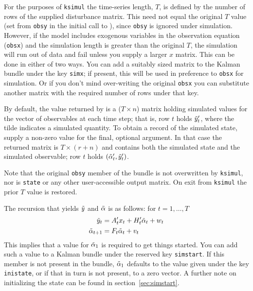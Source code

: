 \documentclass[a4paper]{article}
\begin{document}
For the purposes of \texttt{ksimul} the time-series length, $T$, is
defined by the number of rows of the supplied disturbance matrix. This
need not equal the original $T$ value (set from \texttt{obsy} in the
initial call to ), since \texttt{obsy} is ignored under
simulation. However, if the model includes exogenous variables in the
observation equation (\texttt{obsx}) and the simulation length is
greater than the original $T$, the simulation will run out of data and
fail unless you supply a larger $x$ matrix.  This can be done in
either of two ways. You can add a suitably sized matrix to the Kalman
bundle under the key \texttt{simx}; if present, this will be used in
preference to \texttt{obsx} for simulation. Or if you don't mind
over-writing the original \texttt{obsx} you can substitute another
matrix with the required number of rows under that key.

By default, the value returned by  is a ($T \times n$)
matrix holding simulated values for the vector of observables at each
time step; that is, row $t$ holds $\tilde{y}_t'$, where the tilde
indicates a simulated quantity.  To obtain a record of the simulated
state, supply a non-zero value for the final, optional argument. In
that case the returned matrix is $T \times (r+n)$ and contains both
the simulated state and the simulated observable; row $t$ holds
$(\tilde{\alpha}_t', \tilde{y}_t')$.

Note that the original \texttt{obsy} member of the bundle is not
overwritten by \texttt{ksimul}, nor is \texttt{state} or any other
user-accessible output matrix. On exit from \texttt{ksimul} the prior
$T$ value is restored.

The recursion that yields $\tilde{y}$ and $\tilde{\alpha}$
is as follows: for $t=1,\dots,T$
%
\begin{align*}
  \tilde{y}_t &= A_t'x_t + 
   H_t' \tilde{\alpha}_t + w_t  \\ 
  \tilde{\alpha}_{t+1} &= F_t \tilde{\alpha}_t + v_t
\end{align*}
%
This implies that a value for $\tilde{\alpha}_1$ is required to get
things started. You can add such a value to a Kalman bundle under the
reserved key \texttt{simstart}. If this member is not present in the
bundle, $\tilde{\alpha}_1$ defaults to the value given under the
key \texttt{inistate}, or if that in turn is not present, to a zero
vector. A further note on initializing the state can be found in
section~\ref{sec:simstart}.
\end{document}
